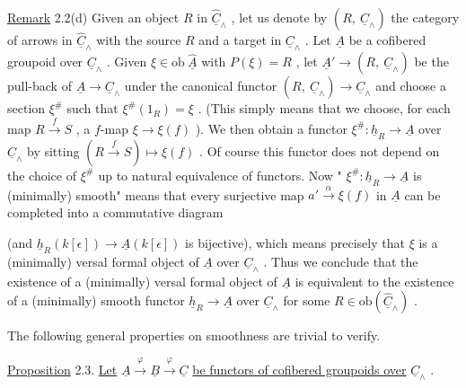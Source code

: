 \underline{Remark} 2.2(d)  Given an object  $R$  in  $\widehat{\underline{C}}_\wedge$ , let us denote by  $(R,\ \underline{C}_\wedge)$  the category of arrows in  $\widehat{\underline{C}}_\wedge$  with the source  $R$  and a target in  $\underline{C}_\wedge$ . Let  $\underline{A}$  be a cofibered groupoid over  $\underline{C}_\wedge$ . Given  $\xi \in \mathrm{ob}\ \widehat{\underline{A}}$  with  $P(\xi) = R$ , let  $\underline{A}' \longrightarrow (R,\ \underline{C}_\wedge)$  be the pull-back of  $\underline{A} \longrightarrow \underline{C}_\wedge$  under the canonical functor  $(R,\ \underline{C}_\wedge) \longrightarrow \underline{C}_\wedge$  and choose a section  $\xi^{\#}$  such that  $\xi^{\#}(1_R) = \xi$ . (This simply means that we choose, for each map  $R \xrightarrow{\ f\ } S$ , a $f$-map  $\xi \longrightarrow \xi(f)$ ). We then obtain a functor  $\xi^{\#} : \underline{h}_R \longrightarrow \underline{A}$  over  $\underline{C}_\wedge$  by sitting  $(R \xrightarrow{\ f\ } S) \longmapsto \xi(f)$ . Of course this functor does not depend on the choice of  $\xi^{\#}$  up to natural equivalence of functors. Now  " $\xi^{\#} : \underline{h}_R \longrightarrow \underline{A}$  is (minimally) smooth"  means that every surjective map  $a' \xrightarrow{\ \alpha\ } \xi(f)$  in  $\underline{A}$  can be completed into a commutative diagram

\begin{center}
\end{center}
(and  $\underline{h}_R(k[\epsilon]) \longrightarrow \underline{A}(k[\epsilon])$   is bijective), which means precisely that  $\xi$  is a (minimally) versal formal object of  $\underline{A}$  over  $\underline{C}_\wedge$ . Thus we conclude that the existence of a (minimally) versal formal object of  $\underline{A}$  is equivalent to the existence of a (minimally) smooth functor  $\underline{h}_R \longrightarrow \underline{A}$  over  $\underline{C}_\wedge$  for some  $R \in \mathrm{ob}(\widehat{\underline{C}}_\wedge)$ .

The following general properties on smoothness are trivial to verify.

\underline{Proposition} 2.3.  \underline{Let}  $\underline{A} \xrightarrow{\ \varphi\ } \underline{B} \xrightarrow{\ \varphi\ } \underline{C}$  \underline{be functors of cofibered groupoids over}  $\underline{C}_\wedge$ .

